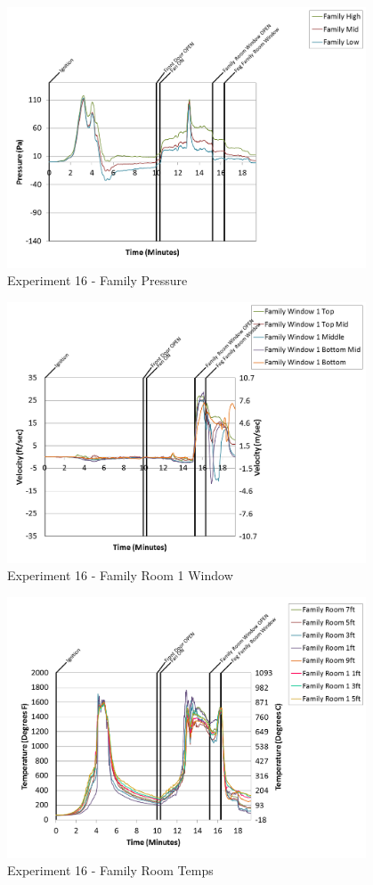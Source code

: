 \documentclass{article}
\begin{document}
\begin{appendices}
\clearpage

\begin{figure}[h!]
	\centering
	\includegraphics[height=3.05in]{0_Images/Results_Charts/Exp_16_Charts/FamilyPressure.png}
	\caption{Experiment 16 - Family Pressure}
\end{figure}


\begin{figure}[h!]
	\centering
	\includegraphics[height=3.05in]{0_Images/Results_Charts/Exp_16_Charts/FamilyRoom1Window.png}
	\caption{Experiment 16 - Family Room 1 Window}
\end{figure}

\clearpage

\begin{figure}[h!]
	\centering
	\includegraphics[height=3.05in]{0_Images/Results_Charts/Exp_16_Charts/FamilyRoomTemps.png}
	\caption{Experiment 16 - Family Room Temps}
\end{figure}



\end{appendices}
\end{document}
